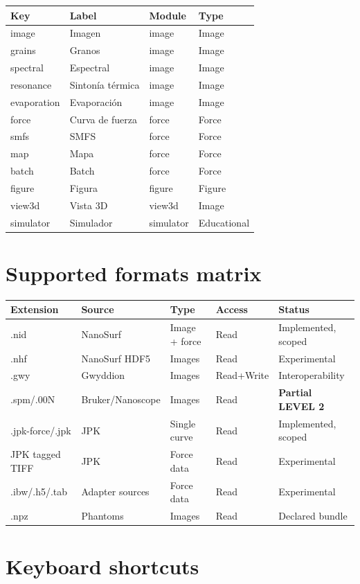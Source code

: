 \documentclass[a4paper,11pt]{article}
\begin{document}
\begin{longtable}{@{}>{\ttfamily}l l l l@{}}
\toprule
Key & Label & Module & Type \\
\midrule
image & Imagen & image & Image \\
grains & Granos & image & Image \\
spectral & Espectral & image & Image \\
resonance & Sintonía térmica & image & Image \\
evaporation & Evaporación & image & Image \\
force & Curva de fuerza & force & Force \\
smfs & SMFS & force & Force \\
map & Mapa & force & Force \\
batch & Batch & force & Force \\
figure & Figura & figure & Figure \\
view3d & Vista 3D & view3d & Image \\
simulator & Simulador & simulator & Educational \\
\bottomrule
\end{longtable}

\section{Supported formats matrix}

\begin{longtable}{@{}l l l l l@{}}
\toprule
Extension & Source & Type & Access & Status \\
\midrule
.nid & NanoSurf & Image + force & Read & Implemented, scoped \\
.nhf & NanoSurf HDF5 & Images & Read & Experimental \\
.gwy & Gwyddion & Images & Read+Write & Interoperability \\
.spm/.00N & Bruker/Nanoscope & Images & Read & \textbf{Partial LEVEL 2} \\
.jpk-force/.jpk & JPK & Single curve & Read & Implemented, scoped \\
JPK tagged TIFF & JPK & Force data & Read & Experimental \\
.ibw/.h5/.tab & Adapter sources & Force data & Read & Experimental \\
.npz & Phantoms & Images & Read & Declared bundle \\
\bottomrule
\end{longtable}

\section{Keyboard shortcuts}
\end{document}
